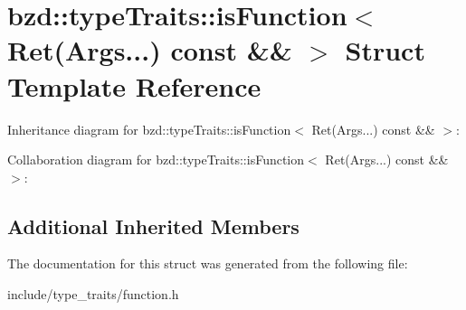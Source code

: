 \hypertarget{structbzd_1_1typeTraits_1_1isFunction_3_01Ret_07Args_8_8_8_08_01const_01_6_6_01_4}{}\section{bzd\+:\+:type\+Traits\+:\+:is\+Function$<$ Ret(Args...) const \&\& $>$ Struct Template Reference}
\label{structbzd_1_1typeTraits_1_1isFunction_3_01Ret_07Args_8_8_8_08_01const_01_6_6_01_4}


Inheritance diagram for bzd\+:\+:type\+Traits\+:\+:is\+Function$<$ Ret(Args...) const \&\& $>$\+:


Collaboration diagram for bzd\+:\+:type\+Traits\+:\+:is\+Function$<$ Ret(Args...) const \&\& $>$\+:
\subsection*{Additional Inherited Members}


The documentation for this struct was generated from the following file\+:\begin{DoxyCompactItemize}
\item 
include/type\+\_\+traits/function.\+h\end{DoxyCompactItemize}
